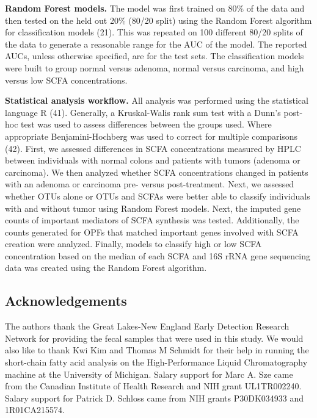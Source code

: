 \documentclass[11pt,]{article}
\begin{document}
\textbf{Random Forest models.} The model was first trained on 80\% of
the data and then tested on the held out 20\% (80/20 split) using the
Random Forest algorithm for classification models (21). This was
repeated on 100 different 80/20 splits of the data to generate a
reasonable range for the AUC of the model. The reported AUCs, unless
otherwise specified, are for the test sets. The classification models
were built to group normal versus adenoma, normal versus carcinoma, and
high versus low SCFA concentrations.

\textbf{Statistical analysis workflow.} All analysis was performed using
the statistical language R (41). Generally, a Kruskal-Walis rank sum
test with a Dunn's post-hoc test was used to assess differences between
the groups used. Where appropriate Benjamini-Hochberg was used to
correct for multiple comparisons (42). First, we assessed differences in
SCFA concentrations measured by HPLC between individuals with normal
colons and patients with tumors (adenoma or carcinoma). We then analyzed
whether SCFA concentrations changed in patients with an adenoma or
carcinoma pre- versus post-treatment. Next, we assessed whether OTUs
alone or OTUs and SCFAs were better able to classify individuals with
and without tumor using Random Forest models. Next, the imputed gene
counts of important mediators of SCFA synthesis was tested.
Additionally, the counts generated for OPFs that matched important genes
involved with SCFA creation were analyzed. Finally, models to classify
high or low SCFA concentration based on the median of each SCFA and 16S
rRNA gene sequencing data was created using the Random Forest algorithm.

\newpage

\subsection{Acknowledgements}\label{acknowledgements}

The authors thank the Great Lakes-New England Early Detection Research
Network for providing the fecal samples that were used in this study. We
would also like to thank Kwi Kim and Thomas M Schmidt for their help in
running the short-chain fatty acid analysis on the High-Performance
Liquid Chromatography machine at the University of Michigan. Salary
support for Marc A. Sze came from the Canadian Institute of Health
Research and NIH grant UL1TR002240. Salary support for Patrick D.
Schloss came from NIH grants P30DK034933 and 1R01CA215574.
\end{document}
